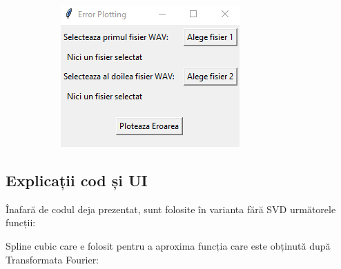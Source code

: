 \documentclass[12pt]{article}
\begin{document}
\begin{figure}[H]
\begin{subfigure}[b]{0.4\textwidth}
	\end{subfigure}
	\hfill
	\begin{subfigure}[b]{0.4\textwidth}
		\includegraphics[width=\linewidth]{ui4.png}
	\end{subfigure}
\end{figure}

\subsection{Explicații cod și UI}

Înafară de codul deja prezentat, sunt folosite în varianta fără SVD următorele funcții:

Spline cubic care e folosit pentru a aproxima funcția care este obținută după Transformata Fourier:
\end{document}
